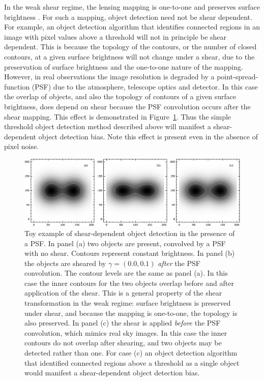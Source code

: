 \documentclass[iop, appendixfloats, numberedappendix, apj]{emulateapj}
\begin{document}
In the weak shear regime, the lensing mapping is one-to-one and preserves
surface brightness \citep{SchneiderBook92}. For such a mapping, object
detection need not be shear dependent. For example, an object detection
algorithm that identifies connected regions in an image with pixel values above
a threshold will not in principle be shear dependent.  This is because the
topology of the contours, or the number of closed contours, at a given surface
brightness will not change under a shear, due to the preservation of surface
brightness and the one-to-one nature of the mapping.  However, in real
observations the image resolution is degraded by a point-spread-function (PSF)
due to the atmosphere, telescope optics and detector. In this case the overlap
of objects, and also the topology of contours of a given surface brightness,
does depend on shear because the PSF convolution occurs after the shear
mapping.  This effect is demonstrated in Figure~\ref{fig:toy}.  Thus the simple
threshold object detection method described above will manifest a
shear-dependent object detection bias. Note this effect is present even in the
absence of pixel noise.

\begin{figure}
    \begin{center}
        \includegraphics[width=\textwidth]{figures/toy.png}

        \caption{ Toy example of shear-dependent object detection in the presence of
        a PSF.  In panel (a) two objects are present, convolved by a PSF with no
        shear.  Contours represent constant brightness.  In panel (b) the objects
        are sheared by $\gamma = (0.0, 0.1)$ {\em after} the PSF convolution.  The
        contour levels are the same as panel (a).  In this case the inner contours
        for the two objects overlap before and after application of the shear. This
        is a general property of the shear transformation in the weak regime:
        surface brightness is preserved under shear, and because the mapping is
        one-to-one, the topology is also preserved. In panel (c) the shear is
        applied {\em before} the PSF convolution, which mimics real sky images. In
        this case the inner contours do not overlap after shearing, and two objects
        may be detected rather than one.  For case (c) an object detection
        algorithm that identified connected regions above a threshold as a single
        object would manifest a shear-dependent object detection bias.
        \label{fig:toy} }
    \end{center}

\end{figure}
\end{document}
